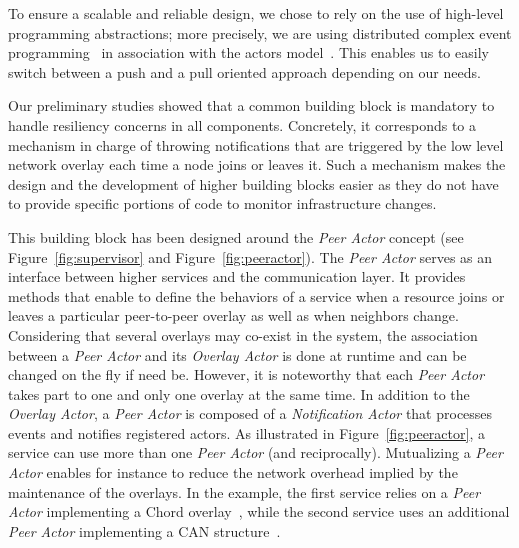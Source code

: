 To ensure a scalable and reliable design, we  chose to rely on the use
of high-level programming abstractions; more precisely, we are using distributed
complex event programming~\cite{janiesch:2011} in association with the actors
model~\cite{agha:1986}. This enables us to easily switch between a push and a pull
oriented approach depending on our needs. 

Our preliminary studies showed that a common building block is mandatory to
handle resiliency concerns in all components. Concretely, it corresponds to a
mechanism in charge of throwing notifications that are triggered by the low
level network overlay each time a node joins or leaves it.  Such a mechanism
makes the design and the development of higher building blocks easier as they do
not have to provide specific portions of code to monitor infrastructure
changes. 

This building block has been designed around the \emph{Peer Actor} concept (see Figure~\ref{fig:supervisor} and
Figure~\ref{fig:peeractor}).
 The \emph{Peer Actor} serves as an interface between higher services
and the communication layer. It provides methods that enable to define the behaviors of a
service when a resource joins or leaves a particular peer-to-peer overlay as well as
when neighbors change.
Considering that several overlays may co-exist in the \discovery system, 
the association between a \emph{Peer Actor} and its \emph{Overlay Actor} is
done at runtime and can be changed on the fly if need be. However, it is noteworthy that 
each \emph{Peer Actor} takes part to one and only one overlay at the same time.  
%
In addition to the \emph{Overlay Actor}, a \emph{Peer Actor}  is composed of a
\emph{Notification Actor}  that processes events and notifies registered actors.
%
As illustrated in Figure~\ref{fig:peeractor}, a service can use more than one \emph{Peer Actor} (and reciprocally). 
Mutualizing a \emph{Peer Actor} enables for instance to reduce the network overhead implied by the maintenance of the overlays. 
In the example, the first service relies on a \emph{Peer Actor} implementing a Chord
overlay~\cite{stoica:2001:sigcomm01}, while the second service uses an additional \emph{Peer Actor} implementing a CAN structure~\cite{ratnasamy:sigcomm01}.
 
